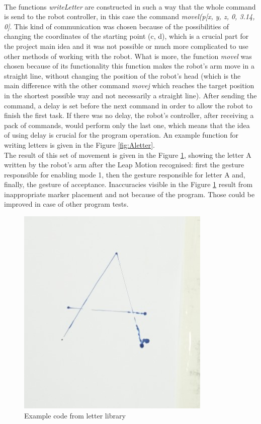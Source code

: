 \mbox{}\\
The functions \textit{writeLetter} are constructed in such a way that the whole command is send to the robot controller, in this case the command \textit{movel(p[x, y, z, 0, 3.14, 0]}. This kind of communication was chosen because of the possibilities of changing the coordinates of the starting point (c, d), which is a crucial part for the project main idea and it was not possible or much more complicated to use other methods of working with the robot. What is more, the function \textit{movel} was chosen because of its functionality \textemdash this function makes the robot's arm move in a straight line, without changing the position of the robot’s head (which is the main difference with the other command \textit{movej} which reaches the target position in the shortest possible way and not necessarily a straight line). After sending the command, a delay is set before the next command in order to allow the robot to finish the first task. If there was no delay, the robot’s controller, after receiving a pack of commands, would perform only the last one, which means that the idea of using delay is crucial for the program operation. An example function for writing letters is given in the Figure \ref{fig:Aletter}. \\


The result of this set of movement is given in the Figure \ref{fig:letter}, showing the letter A written by the robot’s arm after the Leap Motion recognised: first the gesture responsible for enabling mode 1, then the gesture responsible for letter A and, finally, the gesture of acceptance. Inaccuracies visible in the Figure \ref{fig:letter} result from inappropriate marker placement and not because of the program. Those could be improved in case of other program tests. \\

\begin{figure}[H]
	\includegraphics{letter}
	\centering
	\caption{Example code from letter library}
	\label{fig:letter}
\end{figure}


